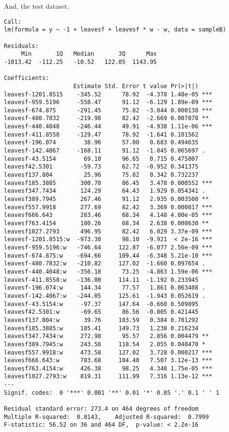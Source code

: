 \documentclass{article}
\begin{document}
And, the test dataset. 

\begin{verbatim}
Call:
lm(formula = y ~ -1 + leavesf + leavesf * w - w, data = sampleB)

Residuals:
     Min       1Q   Median       3Q      Max 
-1013.42  -112.25   -10.52   122.05  1143.95 

Coefficients:
                    Estimate Std. Error t value Pr(>|t|)    
leavesf-1201.8515    -345.52      78.92  -4.378 1.48e-05 ***
leavesf-959.5196     -558.47      91.12  -6.129 1.89e-09 ***
leavesf-674.875      -291.45      75.82  -3.844 0.000138 ***
leavesf-480.7832     -219.98      82.42  -2.669 0.007878 ** 
leavesf-440.4048     -246.44      49.91  -4.938 1.11e-06 ***
leavesf-411.8558     -129.47      78.92  -1.641 0.101562    
leavesf-196.074        38.96      57.00   0.683 0.494635    
leavesf-142.4067     -168.11      91.12  -1.845 0.065697 .  
leavesf-43.5154        69.10      96.65   0.715 0.475007    
leavesf42.5301        -59.73      62.72  -0.952 0.341375    
leavesf137.804         25.96      75.82   0.342 0.732237    
leavesf185.3885       300.70      86.45   3.478 0.000552 ***
leavesf347.7434       124.29      64.43   1.929 0.054341 .  
leavesf389.7945       267.46      91.12   2.935 0.003500 ** 
leavesf557.9918       277.69      82.42   3.369 0.000817 ***
leavesf666.643        283.46      68.34   4.148 4.00e-05 ***
leavesf763.4154       180.26      68.34   2.638 0.008630 ** 
leavesf1027.2793      496.95      82.42   6.029 3.37e-09 ***
leavesf-1201.8515:w  -973.30      98.10  -9.921  < 2e-16 ***
leavesf-959.5196:w   -746.64     122.87  -6.077 2.56e-09 ***
leavesf-674.875:w    -694.66     109.44  -6.348 5.21e-10 ***
leavesf-480.7832:w   -210.82     127.02  -1.660 0.097654 .  
leavesf-440.4048:w   -356.18      73.25  -4.863 1.59e-06 ***
leavesf-411.8558:w   -136.00     114.11  -1.192 0.233945    
leavesf-196.074:w     144.34      77.57   1.861 0.063408 .  
leavesf-142.4067:w   -244.05     125.61  -1.943 0.052619 .  
leavesf-43.5154:w     -97.37     147.64  -0.660 0.509895    
leavesf42.5301:w      -69.65      86.56  -0.805 0.421445    
leavesf137.804:w       39.76     103.59   0.384 0.701292    
leavesf185.3885:w     185.41     149.73   1.238 0.216234    
leavesf347.7434:w     272.98      95.57   2.856 0.004479 ** 
leavesf389.7945:w     243.56     118.54   2.055 0.040470 *  
leavesf557.9918:w     473.58     127.02   3.728 0.000217 ***
leavesf666.643:w      783.68     104.40   7.507 3.12e-13 ***
leavesf763.4154:w     426.38      98.25   4.340 1.75e-05 ***
leavesf1027.2793:w    819.31     111.99   7.316 1.13e-12 ***
---
Signif. codes:  0 '***' 0.001 '**' 0.01 '*' 0.05 '.' 0.1 ' ' 1

Residual standard error: 273.4 on 464 degrees of freedom
Multiple R-squared:  0.8143,	Adjusted R-squared:  0.7999 
F-statistic: 56.52 on 36 and 464 DF,  p-value: < 2.2e-16
\end{verbatim}
\end{document}
